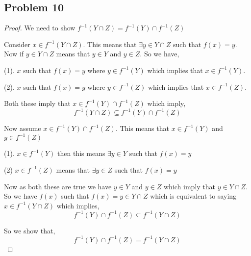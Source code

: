 \documentclass[a4paper]{report}
\begin{document}
\subsection*{Problem 10}
\begin{proof}
    We need to show $f^{-1}(Y \cap Z) = f^{-1}(Y) \cap f^{-1}(Z)$

    Consider $x \in f^{-1}(Y \cap Z)$. This means that $\exists y \in Y \cap Z$ such that $f(x) = y$. Now if $y \in Y \cap Z$ means that $y \in Y$ and  $y \in Z$. So we have, 

    (1). $x$ such that $f(x) = y$ where $y \in f^{-1}(Y)$ which implies that $x \in f^{-1}(Y)$.

    (2). $x$ such that $f(x) = y$ where $y \in f^{-1}(Z)$ which implies that $x \in f^{-1}(Z)$.

    Both these imply that $x \in f^{-1}(Y) \cap f^{-1}(Z)$ which imply,
    $$ f^{-1}(Y \cap Z) \subseteq f^{-1}(Y) \cap f^{-1}(Z) $$

    Now assume $x \in f^{-1}(Y) \cap f^{-1}(Z)$. This means that $x \in f^{-1}(Y)$ and $y \in f^{-1}(Z)$

    (1). $x \in f^{-1}(Y)$ then this means $\exists y \in Y$ such that $f(x) = y$ 

    (2) $x \in f^{-1}(Z)$ means that $\exists y \in Z$ such that $f(x) = y$

    Now as both these are true we have  $y \in Y$ and  $y \in Z$ which imply that $y \in Y \cap Z$. So we have $f(x)$ such that $f(x) = y \in Y \cap Z$ which is equivalent to saying $x \in f^{-1}(Y \cap Z)$ which implies, 
    $$ f^{-1}(Y) \cap f^{-1}(Z) \subseteq f^{-1}(Y \cap Z) $$ 

    So we show that, 
    $$ f^{-1}(Y) \cap f^{-1}(Z) = f^{-1}(Y \cap Z) $$ 
\end{proof}
\end{document}
